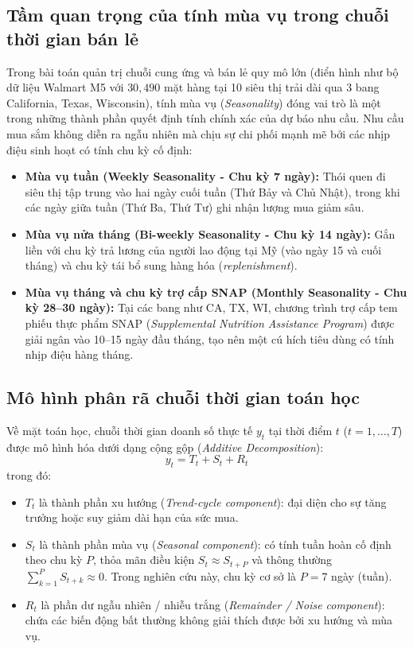 \documentclass[12pt,a4paper,oneside]{article}
\begin{document}
\subsection{Tầm quan trọng của tính mùa vụ trong chuỗi thời gian bán lẻ}
Trong bài toán quản trị chuỗi cung ứng và bán lẻ quy mô lớn (điển hình như bộ dữ liệu Walmart M5 với $30{,}490$ mặt hàng tại 10 siêu thị trải dài qua 3 bang California, Texas, Wisconsin), tính mùa vụ (\textit{Seasonality}) đóng vai trò là một trong những thành phần quyết định tính chính xác của dự báo nhu cầu. Nhu cầu mua sắm không diễn ra ngẫu nhiên mà chịu sự chi phối mạnh mẽ bởi các nhịp điệu sinh hoạt có tính chu kỳ cố định:
\begin{itemize}
    \item \textbf{Mùa vụ tuần (Weekly Seasonality - Chu kỳ 7 ngày):} Thói quen đi siêu thị tập trung vào hai ngày cuối tuần (Thứ Bảy và Chủ Nhật), trong khi các ngày giữa tuần (Thứ Ba, Thứ Tư) ghi nhận lượng mua giảm sâu.
    \item \textbf{Mùa vụ nửa tháng (Bi-weekly Seasonality - Chu kỳ 14 ngày):} Gắn liền với chu kỳ trả lương của người lao động tại Mỹ (vào ngày 15 và cuối tháng) và chu kỳ tái bổ sung hàng hóa (\textit{replenishment}).
    \item \textbf{Mùa vụ tháng và chu kỳ trợ cấp SNAP (Monthly Seasonality - Chu kỳ 28--30 ngày):} Tại các bang như CA, TX, WI, chương trình trợ cấp tem phiếu thực phẩm SNAP (\textit{Supplemental Nutrition Assistance Program}) được giải ngân vào 10--15 ngày đầu tháng, tạo nên một cú hích tiêu dùng có tính nhịp điệu hàng tháng.
\end{itemize}

\subsection{Mô hình phân rã chuỗi thời gian toán học}
Về mặt toán học, chuỗi thời gian doanh số thực tế $y_t$ tại thời điểm $t$ ($t = 1, \dots, T$) được mô hình hóa dưới dạng cộng gộp (\textit{Additive Decomposition}):
\begin{equation}
    y_t = T_t + S_t + R_t
    \label{eq:additive_decomp}
\end{equation}
trong đó:
\begin{itemize}
    \item $T_t$ là thành phần xu hướng (\textit{Trend-cycle component}): đại diện cho sự tăng trưởng hoặc suy giảm dài hạn của sức mua.
    \item $S_t$ là thành phần mùa vụ (\textit{Seasonal component}): có tính tuần hoàn cố định theo chu kỳ $P$, thỏa mãn điều kiện $S_{t} \approx S_{t+P}$ và thông thường $\sum_{k=1}^P S_{t+k} \approx 0$. Trong nghiên cứu này, chu kỳ cơ sở là $P = 7$ ngày (tuần).
    \item $R_t$ là phần dư ngẫu nhiên / nhiễu trắng (\textit{Remainder / Noise component}): chứa các biến động bất thường không giải thích được bởi xu hướng và mùa vụ.
\end{itemize}
\end{document}
